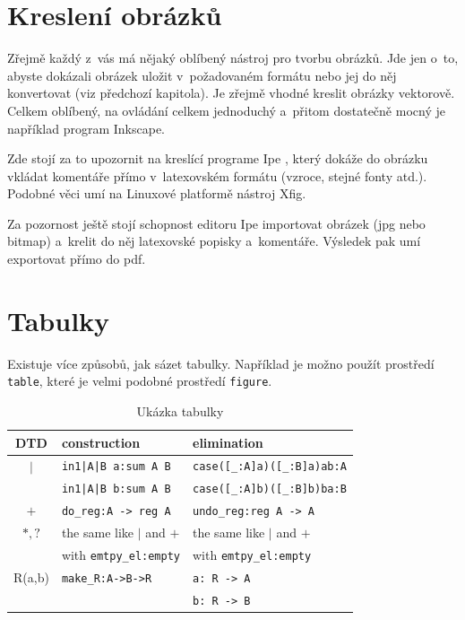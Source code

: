 \documentclass[11pt,twoside,a4paper]{book}
\begin{document}
\section{Kreslení obrázků}
Zřejmě každý z~vás má nějaký oblíbený nástroj pro tvorbu obrázků. Jde jen o~to, abyste dokázali obrázek uložit
v~požadovaném formátu nebo jej do něj konvertovat (viz předchozí kapitola). Je zřejmě vhodné kreslit obrázky vektorově.
Celkem oblíbený, na ovládání celkem jednoduchý a~přitom dostatečně mocný je například program Inkscape.

Zde stojí za to upozornit na kreslící programe Ipe \cite{ipe}, který dokáže do obrázku vkládat komentáře přímo
v~latexovském formátu (vzroce, stejné fonty atd.). Podobné věci umí na Linuxové platformě nástroj Xfig. 

Za pozornost ještě stojí schopnost editoru Ipe importovat obrázek (jpg nebo bitmap) a~krelit do něj latexovské popisky
a~komentáře. Výsledek pak umí exportovat přímo do pdf.


\section{Tabulky}
Existuje více způsobů, jak sázet tabulky. Například je možno použít prostředí \verb|table|, které je velmi podobné
prostředí \verb|figure|. 

\begin{table}
\begin{center}
\begin{tabular}{|c|l|l|}
\hline
\textbf{DTD} & \textbf{construction} & \textbf{elimination} \\
\hline
$\mid$ & \verb+in1|A|B a:sum A B+ & \verb+case([_:A]a)([_:B]a)ab:A+\\
&\verb+in1|A|B b:sum A B+ & \verb+case([_:A]b)([_:B]b)ba:B+\\
\hline
$+$&\verb+do_reg:A -> reg A+&\verb+undo_reg:reg A -> A+\\
\hline
$*,?$& the same like $\mid$ and $+$ & the same like $\mid$ and $+$\\
& with \verb+emtpy_el:empty+ & with \verb+emtpy_el:empty+\\
\hline
R(a,b) & \verb+make_R:A->B->R+ & \verb+a: R -> A+\\
 & & \verb+b: R -> B+\\
\hline
\end{tabular}
\end{center}
\caption{Ukázka tabulky}
\label{tab:tab1}
\end{table}
\end{document}
